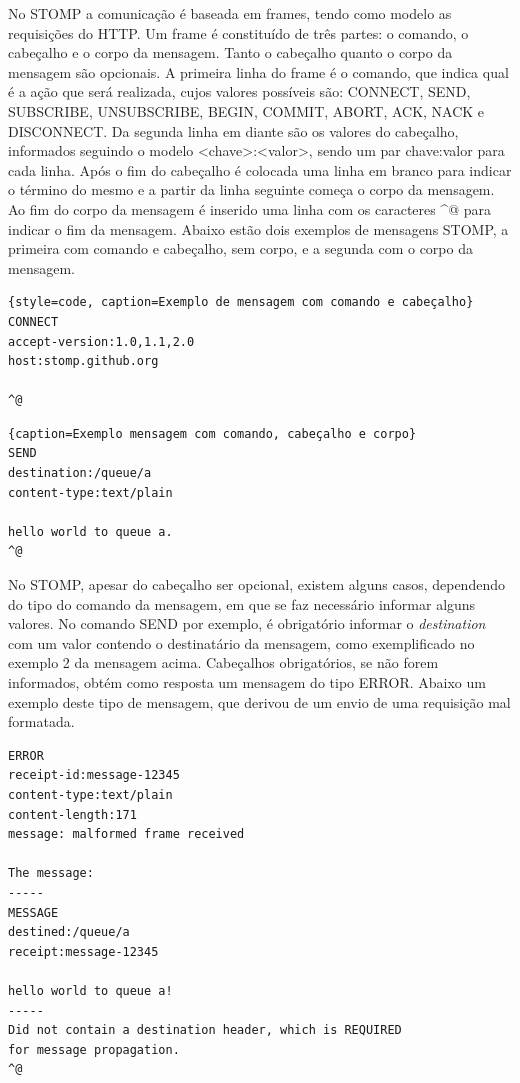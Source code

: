 No STOMP a comunicação é baseada em frames, tendo como modelo as requisições do HTTP. Um frame é constituído de três partes: o comando, o cabeçalho e o corpo da mensagem. Tanto o cabeçalho quanto o corpo da mensagem são opcionais. A primeira linha do frame é o comando, que indica qual é a ação que será realizada, cujos valores possíveis são: CONNECT, SEND, SUBSCRIBE, UNSUBSCRIBE, BEGIN, COMMIT, ABORT, ACK, NACK e DISCONNECT. Da segunda linha em diante são os valores do cabeçalho, informados seguindo o modelo <chave>:<valor>, sendo um par chave:valor para cada linha. Após o fim do cabeçalho é colocada uma linha em branco para indicar o término do mesmo e a partir da linha seguinte começa o corpo da mensagem. Ao fim do corpo da mensagem é inserido uma linha com os caracteres \^{}@ para indicar o fim da mensagem. Abaixo estão dois exemplos de mensagens STOMP, a primeira com comando e cabeçalho, sem corpo, e a segunda com o corpo da mensagem.

\begin{lstlisting}{style=code, caption=Exemplo de mensagem com comando e cabeçalho}
CONNECT
accept-version:1.0,1.1,2.0
host:stomp.github.org

^@
\end{lstlisting}

\begin{lstlisting}{caption=Exemplo mensagem com comando, cabeçalho e corpo}
SEND
destination:/queue/a
content-type:text/plain

hello world to queue a.
^@
\end{lstlisting}

No STOMP, apesar do cabeçalho ser opcional, existem alguns casos, dependendo do tipo do comando da mensagem, em que se faz necessário informar alguns valores. No comando SEND por exemplo, é obrigatório informar o \textit{destination} com um valor contendo o destinatário da mensagem, como exemplificado no exemplo 2 da mensagem acima. Cabeçalhos obrigatórios, se não forem informados, obtém como resposta um mensagem do tipo ERROR. Abaixo um exemplo deste tipo de mensagem, que derivou de um envio de uma requisição mal formatada.

\begin{lstlisting}
ERROR
receipt-id:message-12345
content-type:text/plain
content-length:171
message: malformed frame received

The message:
-----
MESSAGE
destined:/queue/a
receipt:message-12345

hello world to queue a!
-----
Did not contain a destination header, which is REQUIRED
for message propagation.
^@
\end{lstlisting}

